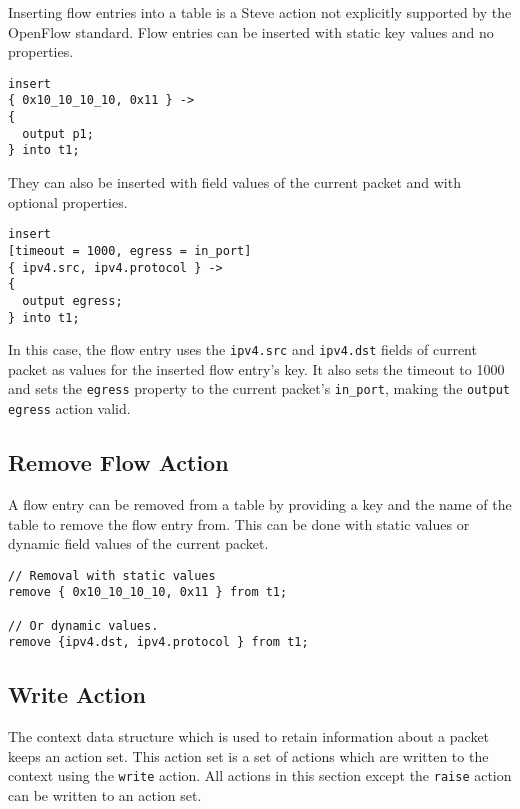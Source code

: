 Inserting flow entries into a table is a Steve action not explicitly supported by the OpenFlow standard. Flow entries can be inserted with static key values and no properties.

\begin{lstlisting}[float]
insert
{ 0x10_10_10_10, 0x11 } ->
{
  output p1;
} into t1;
\end{lstlisting}

They can also be inserted with field values of the current packet and with optional properties.

\begin{lstlisting}[float]
insert
[timeout = 1000, egress = in_port]
{ ipv4.src, ipv4.protocol } ->
{
  output egress;
} into t1;
\end{lstlisting}

In this case, the flow entry uses the \texttt{ipv4.src} and \texttt{ipv4.dst} fields of current packet as values for the inserted flow entry's key. It also sets the timeout to 1000 and sets the \texttt{egress} property to the current packet's \texttt{in\_port}, making the \texttt{output egress} action valid.

\subsection{Remove Flow Action} \label{remove_flow_action_tut}

A flow entry can be removed from a table by providing a key and the name of the table to remove the flow entry from. This can be done with static values or dynamic field values of the current packet.

\begin{lstlisting}[float]
// Removal with static values
remove { 0x10_10_10_10, 0x11 } from t1;

// Or dynamic values.
remove {ipv4.dst, ipv4.protocol } from t1;
\end{lstlisting}

\subsection{Write Action} \label{write_action_tut}

The context data structure which is used to retain information about a packet keeps an action set. This action set is a set of actions which are written to the context using the \texttt{write} action. All actions in this section except the \texttt{raise} action can be written to an action set.

